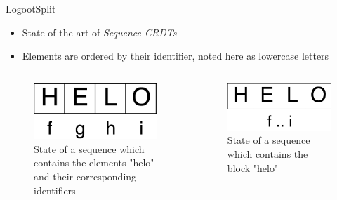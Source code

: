 \documentclass[10pt]{beamer}
\begin{document}
\begin{frame}{LogootSplit \cite{AndreCollaborateCom2013}}
  \begin{itemize}
    \item State of the art of \emph{Sequence \acp{CRDT}}
    \item Elements are ordered by their identifier, noted here as lowercase letters
  \end{itemize}

  \pause

  \begin{columns}
    \begin{column}{0.5\textwidth}
      \begin{figure}
        \includegraphics[scale=0.15]{img/helo-as-letters.png}
        \caption{State of a sequence which contains the elements "helo" and their corresponding identifiers}
      \end{figure}
    \end{column}
    \pause
    \begin{column}{0.5\textwidth}
      \begin{figure}
        \includegraphics[scale=0.15]{img/helo-as-block.png}
        \caption{State of a sequence which contains the block "helo"}
      \end{figure}
    \end{column}
  \end{columns}
\end{frame}
\end{document}
